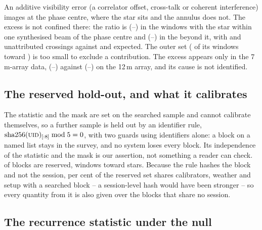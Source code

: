 An additive visibility error (a correlator offset, cross-talk or coherent
interference) images at the phase centre, where the star sits and the annulus
does not. The excess is not confined there: the ratio is \BgPcOnRatio{}
(\BgPcOnRatioLo--\BgPcOnRatioHi) in the \BgPcOnNWin{} windows with the star
within one synthesised beam of the phase centre and \BgPcOffRatio{}
(\BgPcOffRatioLo--\BgPcOffRatioHi) in the \BgPcOffNWin{} beyond it, with
\BgPcOnObs{} and \BgPcOffObs{} unattributed crossings against \BgPcOnExp{} and
\BgPcOffExp{} expected. The outer set (\BgPcOffTopN{} of its windows toward
\BkAlmaName) is too small to exclude a contribution. The excess appears only
in the 7\,m-array data, \BgArrSevenRatio{}
(\BgArrSevenRatioLo--\BgArrSevenRatioHi) against \BgArrTwelveRatio{}
(\BgArrTwelveRatioLo--\BgArrTwelveRatioHi) on the 12\,m array, and its cause is
not identified.

\subsection{The reserved hold-out, and what it calibrates}
\label{sec:heldout}

The statistic and the mask are set on the searched sample and cannot
calibrate themselves, so a further sample is held out by an identifier rule,
$\mathrm{sha256}(\textsc{uid})_{[:8]} \bmod 5 = 0$, with two guards using
identifiers alone: a block on a named list stays in the survey, and no system
loses every block. Its independence of the statistic and the mask is our
assertion, not something a reader can check. \NEbHeldOut{} of
\NEbProcessedAll{} blocks are reserved, \HoWin{} windows toward \HoStars{}
stars. Because the rule hashes the block and not the session, \HsSharePct{}
per cent of the reserved set shares calibrators, weather and setup with a
searched block -- a session-level hash would have been stronger -- so every
quantity from it is also given over the \HsIndBlocks{} blocks that share no
session.

\subsection{The recurrence statistic under the null}
\label{sec:nullscatter}

